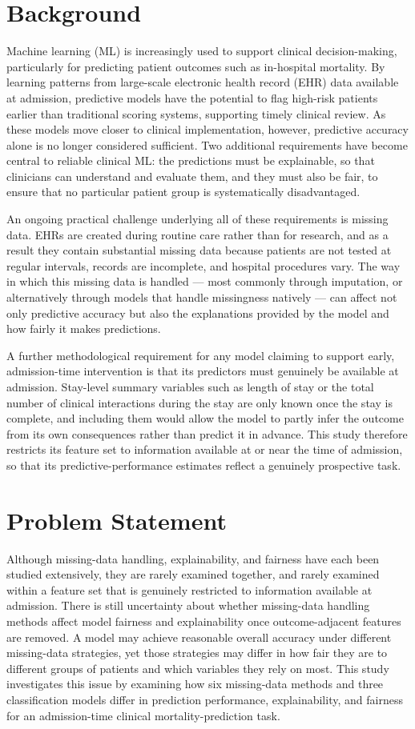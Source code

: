 \documentclass[12pt,a4paper]{report}
\begin{document}
\section{Background}
Machine learning (ML) is increasingly used to support clinical decision-making, particularly for predicting patient outcomes such as in-hospital mortality. By learning patterns from large-scale electronic health record (EHR) data available at admission, predictive models have the potential to flag high-risk patients earlier than traditional scoring systems, supporting timely clinical review. As these models move closer to clinical implementation, however, predictive accuracy alone is no longer considered sufficient. Two additional requirements have become central to reliable clinical ML: the predictions must be explainable, so that clinicians can understand and evaluate them, and they must also be fair, to ensure that no particular patient group is systematically disadvantaged.

An ongoing practical challenge underlying all of these requirements is missing data. EHRs are created during routine care rather than for research, and as a result they contain substantial missing data because patients are not tested at regular intervals, records are incomplete, and hospital procedures vary. The way in which this missing data is handled --- most commonly through imputation, or alternatively through models that handle missingness natively --- can affect not only predictive accuracy but also the explanations provided by the model and how fairly it makes predictions.

A further methodological requirement for any model claiming to support early, admission-time intervention is that its predictors must genuinely be available at admission. Stay-level summary variables such as length of stay or the total number of clinical interactions during the stay are only known once the stay is complete, and including them would allow the model to partly infer the outcome from its own consequences rather than predict it in advance. This study therefore restricts its feature set to information available at or near the time of admission, so that its predictive-performance estimates reflect a genuinely prospective task.

\section{Problem Statement}
Although missing-data handling, explainability, and fairness have each been studied extensively, they are rarely examined together, and rarely examined within a feature set that is genuinely restricted to information available at admission. There is still uncertainty about whether missing-data handling methods affect model fairness and explainability once outcome-adjacent features are removed. A model may achieve reasonable overall accuracy under different missing-data strategies, yet those strategies may differ in how fair they are to different groups of patients and which variables they rely on most. This study investigates this issue by examining how six missing-data methods and three classification models differ in prediction performance, explainability, and fairness for an admission-time clinical mortality-prediction task.
\end{document}
